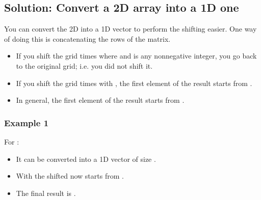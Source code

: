 \documentclass[letterpaper,12pt,english]{book}
\begin{document}
\subsection{Solution: Convert a 2D array into a 1D one}
\label{\detokenize{Array/01_ARR_1260_Shift_2D_Grid:solution-convert-a-2d-array-into-a-1d-one}}
\sphinxAtStartPar
You can convert the 2D  into a 1D vector  to perform the shifting easier. One way of doing this is concatenating the rows of the matrix.
\begin{itemize}
\item {} 
\sphinxAtStartPar
If you shift the grid  times where  and  is any non\sphinxhyphen{}negative integer, you go back to the original grid; i.e. you did not shift it.

\item {} 
\sphinxAtStartPar
If you shift the grid  times with , the first element of the result starts from .

\item {} 
\sphinxAtStartPar
In general, the first element of the result starts from .

\end{itemize}


\subsubsection{Example 1}
\label{\detokenize{Array/01_ARR_1260_Shift_2D_Grid:id1}}
\sphinxAtStartPar
For :
\begin{itemize}
\item {} 
\sphinxAtStartPar
It can be converted into a 1D vector  of size .

\item {} 
\sphinxAtStartPar
With  the shifted  now starts from .

\item {} 
\sphinxAtStartPar
The final result is .

\end{itemize}
\end{document}
